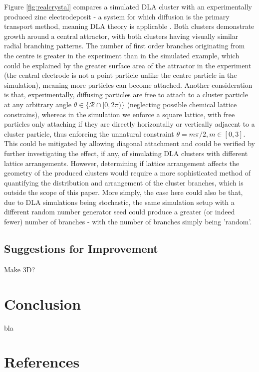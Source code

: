\documentclass[11pt]{iopart}
\begin{document}
Figure \ref{fig:realcrystal} compares a simulated DLA cluster with an experimentally produced zinc electrodeposit - a system for which diffusion is the primary transport method, meaning DLA theory is applicable \cite{dla}. Both clusters demonstrate growth around a central attractor, with both clusters having visually similar radial branching patterns. The number of first order branches originating from the centre is greater in the experiment than in the simulated example, which could be explained by the greater surface area of the attractor in the experiment (the central electrode is not a point particle unlike the centre particle in the simulation), meaning more particles can become attached. Another consideration is that, experimentally, diffusing particles are free to attach to a cluster particle at any arbitrary angle $\theta \in \{\mathcal{R} \cap [0, 2\pi) \}$ (neglecting possible chemical lattice constrains), whereas in the simulation we enforce a square lattice, with free particles only attaching if they are directly horizontally or vertically adjacent to a cluster particle, thus enforcing the unnatural constraint $\theta = m\pi/2, m \in [0,3]$. This could be mitigated by allowing diagonal attachment and could be verified by further investigating the effect, if any, of simulating DLA clusters with different lattice arrangements. However, determining if lattice arrangement affects the geometry of the produced clusters would require a more sophisticated method of quantifying the distribution and arrangement of the cluster branches, which is outside the scope of this paper.  More simply, the case here could also be that, due to DLA simulations being stochastic, the same simulation setup with a different random number generator seed could produce a greater (or indeed fewer) number of branches -  with the number of branches simply being 'random'.

\subsection{Suggestions for Improvement}
Make 3D?

\section{Conclusion}
bla

\section*{References}


\end{document}
